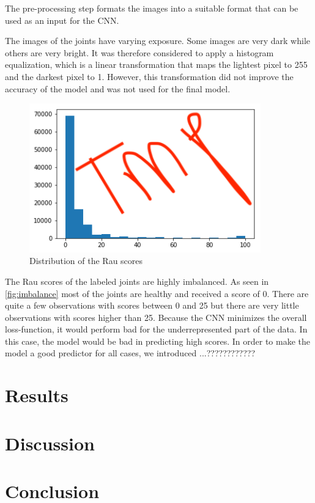 \documentclass[12pt]{article}
\begin{document}
The pre-processing step formats the images into a suitable format that can be used as an input for the CNN. 

The images of the joints have varying exposure. Some images are very dark while others are very bright. It was therefore considered to apply a histogram equalization, which is a linear transformation that maps the lightest pixel to 255 and the darkest pixel to 1. However, this transformation did not improve the accuracy of the model and was not used for the final model.

\begin{figure}[ht]
\includegraphics[width=10cm]{imbalance}	
\caption{Distribution of the Rau scores}
\label{fig:imbalance}
\end{figure}

The Rau scores of the labeled joints are highly imbalanced. As seen in \autoref{fig:imbalance} most of the joints are healthy and received a score of 0. There are quite a few observations with scores between 0 and 25 but there are very little observations with scores higher than 25. Because the CNN minimizes the overall loss-function, it would perform bad for the underrepresented part of the data. In this case, the model would be bad in predicting high scores. In order to make the model a good predictor for all cases, we introduced ...????????????









\section{Results}


\section{Discussion}


\section{Conclusion}



\newpage
\printbibliography

\newpage
\listoffigures
\end{document}
